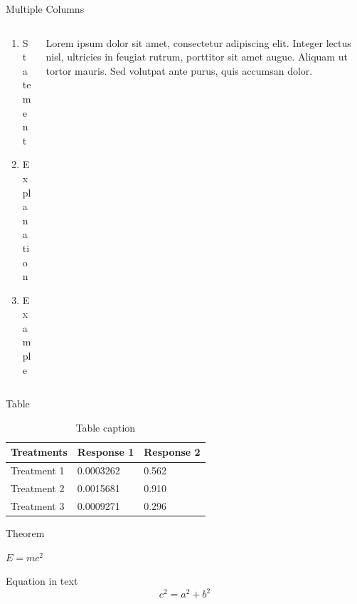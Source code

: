 \documentclass[aspectratio=169,xcolor=dvipsnames, t]{beamer}
\begin{document}
\begin{frame}{Multiple Columns}
    \begin{columns}
    \begin{column}{0.45\textwidth}
        \begin{enumerate}
            \item Statement
            \item Explanation
            \item Example
        \end{enumerate}
    \end{column}
    \begin{column}{0.45\textwidth}  %
        Lorem ipsum dolor sit amet, consectetur adipiscing elit. Integer lectus nisl, ultricies in feugiat rutrum, porttitor sit amet augue. Aliquam ut tortor mauris. Sed volutpat ante purus, quis accumsan dolor.
    \end{column}
    \end{columns}
\end{frame}
\begin{frame}{Table}
    \begin{table}
        \begin{tabular}{l l l}
            \toprule
            \textbf{Treatments} & \textbf{Response 1} & \textbf{Response 2} \\
            \midrule
            Treatment 1         & 0.0003262           & 0.562               \\
            Treatment 2         & 0.0015681           & 0.910               \\
            Treatment 3         & 0.0009271           & 0.296               \\
            \bottomrule
        \end{tabular}
        \caption{Table caption}
    \end{table}
\end{frame}

\begin{frame}{Theorem}
    \begin{theorem}
        $E = mc^2$
    \end{theorem}
    Equation in text
    \begin{equation}
        c^{2} = a^{2} + b^{2}
    \end{equation}
\end{frame}
\end{document}
